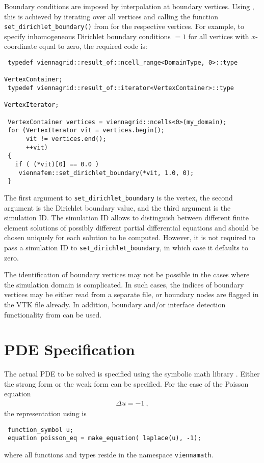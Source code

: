 Boundary conditions are imposed by interpolation at boundary vertices. Using {\ViennaGrid}, this is achieved by iterating over all vertices and
calling the function \lstinline|set_dirichlet_boundary()| from {\ViennaFEM} for the respective vertices. For example, to specify inhomogeneous Dirichlet
boundary conditions $ = 1$ for all vertices with $x$-coordinate equal to zero, the required code is:
\begin{lstlisting}
 typedef viennagrid::result_of::ncell_range<DomainType, 0>::type
                                                           VertexContainer;
 typedef viennagrid::result_of::iterator<VertexContainer>::type
                                                           VertexIterator;

 VertexContainer vertices = viennagrid::ncells<0>(my_domain);
 for (VertexIterator vit = vertices.begin();
      vit != vertices.end();
      ++vit)
 {
   if ( (*vit)[0] == 0.0 )
    viennafem::set_dirichlet_boundary(*vit, 1.0, 0);
 }
\end{lstlisting}
The first argument to \lstinline|set_dirichlet_boundary| is the vertex, the second argument is the Dirichlet boundary value, and the third argument is
the simulation ID. The simulation ID allows to distinguish between different finite element solutions of possibly different partial differential equations and
should be chosen uniquely for each solution to be computed. However, it is not required to pass a simulation ID to \lstinline|set_dirichlet_boundary|, in which
case it defaults to zero.

The identification of boundary vertices may not be possible in the cases where the simulation domain is complicated. In such cases, the indices of boundary
vertices may be either read from a separate file, or boundary nodes are flagged in the VTK file already. In addition, boundary and/or interface detection
functionality from {\ViennaGrid} can be used.


\section{PDE Specification}
The actual PDE to be solved is specified using the symbolic math library {\ViennaMath}.
Either the strong form or the weak form can be specified. For the case of the Poisson equation
\begin{align}
 \Delta u = -1 \ ,
\end{align}
the representation using {\ViennaMath} is
\begin{lstlisting}
 function_symbol u;
 equation poisson_eq = make_equation( laplace(u), -1);
\end{lstlisting}
where all functions and types reside in the namespace \lstinline|viennamath|.

